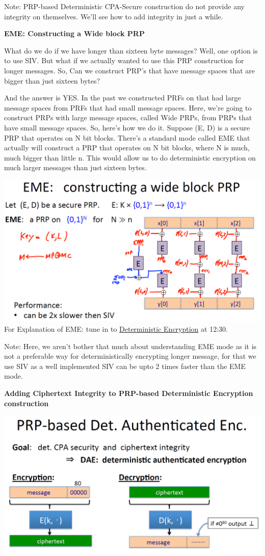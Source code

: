 \documentclass[11pt]{article}
\makeatletter
\def\maxwidth{\ifdim\Gin@nat@width>\linewidth\linewidth
    \else\Gin@nat@width\fi}
\let\Oldincludegraphics\includegraphics
\renewcommand{\includegraphics}[1]{\Oldincludegraphics[width=.8\maxwidth]{#1}}
\makeatother
\begin{document}
Note: PRP-based Deterministic CPA-Secure construction do not provide any
integrity on themselves. We'll see how to add integrity in just a while.

\textbf{EME: Constructing a Wide block PRP}

What do we do if we have longer than sixteen byte messages? Well, one
option is to use SIV. But what if we actually wanted to use this PRP
construction for longer messages. So, Can we construct PRP's that have
message spaces that are bigger than just sixteen bytes?

And the answer is YES. In the past we constructed PRFs on that had large
message spaces from PRFs that had small message spaces. Here, we're
going to construct PRPs with large message spaces, called Wide PRPs,
from PRPs that have small message spaces. So, here's how we do it.
Suppose (E, D) is a secure PRP that operates on N bit blocks. There's a
standard mode called EME that actually will construct a PRP that
operates on N bit blocks, where N is much, much bigger than little n.
This would allow us to do deterministic encryption on much larger
messages than just sixteen bytes.

\includegraphics{./Images/EME-WidePRP.png} For Explanation of EME: tune
in to
\href{https://www.coursera.org/learn/crypto/lecture/hM7f2/deterministic-encryption-siv-and-wide-prp}{Deterministic
Encryption} at 12:30.

Note: Here, we aren't bother that much about understanding EME mode as
it is not a preferable way for deterministically encrypting longer
message, for that we use SIV as a well implemented SIV can be upto 2
times faster than the EME mode.

\textbf{Adding Ciphertext Integrity to PRP-based Deterministic
Encryption construction}

\includegraphics{./Images/PRPbasedDAE.png}
\end{document}
